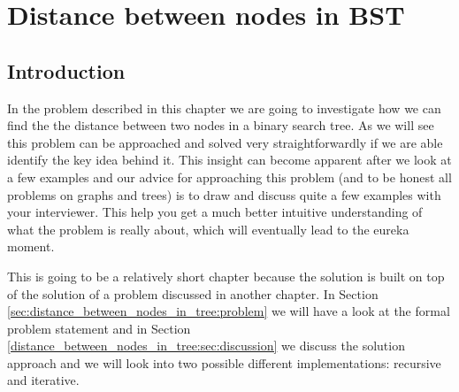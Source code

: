 %

\chapter{Distance between nodes in BST}
\label{ch:distance_between_nodes_in_tree}
\section*{Introduction}

In the problem described in this chapter  we are going to investigate how we can find the the
distance between two nodes in a binary search tree. As we will see this problem can be approached
and solved very straightforwardly if we are able identify the key idea behind it. This insight can
become apparent after we look at a few examples and our advice for approaching this problem (and to
be honest all problems on graphs and trees) is to draw and discuss quite a few examples with your
interviewer. This help you get a much better intuitive understanding of what the problem is really
about, which will eventually lead to the eureka moment.

This is going to be a relatively short chapter because the solution is built on top of the solution
of a problem discussed in another chapter. In Section
\ref{sec:distance_between_nodes_in_tree:problem} we will have a look at the formal problem statement
and in Section \ref{distance_between_nodes_in_tree:sec:discussion} we discuss the solution approach
and we will look into two possible different implementations: recursive and iterative. 

